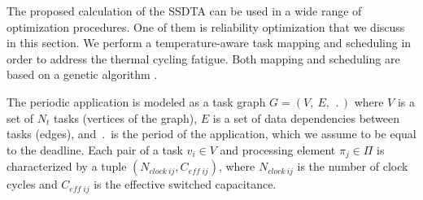 The proposed calculation of the SSDTA can be used in a wide range of optimization procedures. One of them is reliability optimization that we discuss in this section. We perform a temperature-aware task mapping and scheduling in order to address the thermal cycling fatigue. Both mapping and scheduling are based on a genetic algorithm \cite{schmitz2004}.

 \label{sec:application-model}
The periodic application is modeled as a task graph $G = (V, \: E, \: \period)$ where $V$ is a set of $N_t$ tasks (vertices of the graph), $E$ is a set of data dependencies between tasks (edges), and $\period$ is the period of the application, which we assume to be equal to the deadline. Each pair of a task $v_i \in V$ and processing element $\pi_j \in \Pi$ is characterized by a tuple $(N_{clock \: ij}, C_{eff \; ij})$, where $N_{clock \: ij}$ is the number of clock cycles and $C_{eff \; ij}$ is the effective switched capacitance.

 \label{sec:reliability-model}


 \label{sec:reliability-problem}

